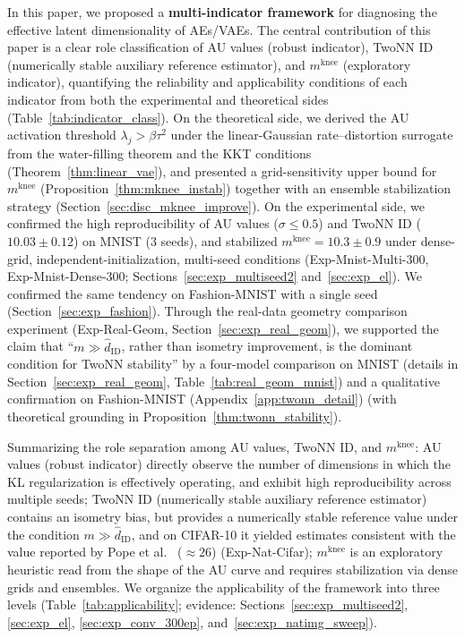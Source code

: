 \documentclass[make,article,submit,pdftex,moreauthors]{Definitions/mdpi}
\newcommand{\mknee}{m^{\mathrm{knee}}}
\begin{document}
In this paper, we proposed a \textbf{multi-indicator framework} for diagnosing
the effective latent dimensionality of AEs/VAEs.
The central contribution of this paper is a clear role classification of AU
values (robust indicator), TwoNN ID (numerically stable auxiliary reference
estimator), and $\mknee$ (exploratory indicator), quantifying the reliability
and applicability conditions of each indicator from both the experimental and
theoretical sides (Table~\ref{tab:indicator_class}).
On the theoretical side, we derived the AU activation threshold
$\lambda_j > \beta\tau^2$ under the linear-Gaussian rate--distortion surrogate
from the water-filling theorem and the KKT conditions
(Theorem~\ref{thm:linear_vae}), and presented a grid-sensitivity upper bound
for $\mknee$ (Proposition~\ref{thm:mknee_instab}) together with an ensemble
stabilization strategy (Section~\ref{sec:disc_mknee_improve}).
On the experimental side, we confirmed the high reproducibility of AU values
($\sigma \leq 0.5$) and TwoNN ID ($10.03 \pm 0.12$) on MNIST (3 seeds), and
stabilized $\mknee = 10.3 \pm 0.9$ under dense-grid,
independent-initialization, multi-seed conditions
(Exp-Mnist-Multi-300, Exp-Mnist-Dense-300;
Sections~\ref{sec:exp_multiseed2} and~\ref{sec:exp_el}).
We confirmed the same tendency on Fashion-MNIST with a single seed
(Section~\ref{sec:exp_fashion}).
Through the real-data geometry comparison experiment
(Exp-Real-Geom, Section~\ref{sec:exp_real_geom}), we supported the claim that
``$m \gg \hat{d}_\mathrm{ID}$, rather than isometry improvement, is the
dominant condition for TwoNN stability'' by a four-model comparison on MNIST
(details in Section~\ref{sec:exp_real_geom}, Table~\ref{tab:real_geom_mnist})
and a qualitative confirmation on Fashion-MNIST
(Appendix~\ref{app:twonn_detail})
(with theoretical grounding in Proposition~\ref{thm:twonn_stability}).

Summarizing the role separation among AU values, TwoNN ID, and $\mknee$:
AU values (robust indicator) directly observe the number of dimensions in
which the KL regularization is effectively operating, and exhibit high
reproducibility across multiple seeds;
TwoNN ID (numerically stable auxiliary reference estimator) contains an
isometry bias, but provides a numerically stable reference value under the
condition $m \gg \hat{d}_\mathrm{ID}$, and on CIFAR-10 it yielded estimates
consistent with the value reported by Pope et al.~\cite{pope2021intrinsic}
($\approx 26$) (Exp-Nat-Cifar);
$\mknee$ is an exploratory heuristic read from the shape of the AU curve and
requires stabilization via dense grids and ensembles.
We organize the applicability of the framework into three levels
(Table~\ref{tab:applicability};
evidence: Sections~\ref{sec:exp_multiseed2}, \ref{sec:exp_el},
\ref{sec:exp_conv_300ep}, and~\ref{sec:exp_natimg_sweep}).
\end{document}
